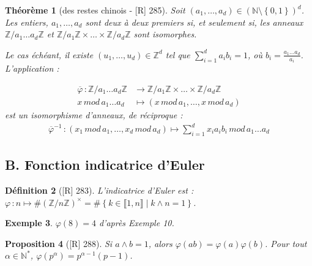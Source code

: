 \documentclass[10pt, a4paper, parskip=full, twoside, twocolumn]{report}
\newtheorem{definition}{Définition}
\newtheorem{theorem}[definition]{Théorème}
\newtheorem{proposition}[definition]{Proposition}
\newtheorem{example}[definition]{Exemple}
\newcommand{\IN}{\mathbb{N}}
\newcommand{\IZ}{\mathbb{Z}}
\newcommand{\IZnZ}{\mathbb{Z}/n\mathbb{Z}}
\begin{document}
\begin{tcolorbox}[
    breakable, %
    colback=developpement, %
    colframe=gray!0!black, %
    boxrule=0pt, %
    arc=1mm, %
	boxsep=0pt,
	left=0pt, right=0pt, top=0pt, bottom=0pt
]
\begin{theorem}[des restes chinois - \textnormal{[R] 285}]
	\label{120dev1}
	Soit $(a_1,\dots, a_d)\in \left(\IN\setminus \left\{0,1\right\}\right)^d$.
	Les entiers, $a_1,\dots, a_d$ sont deux à deux premiers si, et seulement si, les anneaux 
	$\IZ/a_1\dots a_d\IZ$ et $\IZ/a_1\IZ \times \dots \times \IZ/a_d\IZ$ sont isomorphes.

	Le cas échéant, il existe $(u_1,\dots,u_d)\in\IZ^d$ tel que $\sum_{i=1}^{d} a_ib_i =1$, où 
	$b_i = \frac{a_1\dots a_d}{a_i}$. L'application :

	\begin{align*}
		\overline{\varphi} \,\colon \IZ/a_1\dots a_d\IZ &\to \IZ/a_1\IZ \times \dots \times \IZ/a_d\IZ \\
		x\,mod\,a_1\dots a_d &\mapsto (x\,mod\,a_1,\dots, x\, mod\, a_d)
	\end{align*}
	est un isomorphisme d'anneaux, de réciproque :
	\begin{align*}
		\overline{\varphi}^{-1}\,\colon (x_1\,mod\,a_1,\dots, x_d\, mod\, a_d) \mapsto \sum_{i=1}^{d} x_i a_i b_i\, mod\, a_1\dots a_d
	\end{align*}
\end{theorem}
\end{tcolorbox}

\subsection*{B. Fonction indicatrice d'Euler}
\begin{definition}[\textnormal{[R] 283}]
	\emph{L'indicatrice d'Euler} est :
	$\varphi\,\colon n \mapsto \#\left(\IZnZ\right)^{\times} = \#\left\{k\in\llbracket 1,n\rrbracket \mid k\wedge n = 1\right\}$.
\end{definition}

\begin{example}
	$\varphi(8) = 4$ d'après Exemple 10.
\end{example}

\begin{proposition}[\textnormal{[R] 288}]
	Si $a\wedge b=1$, alors $\varphi(ab)=\varphi(a)\varphi(b)$.
	Pour tout $\alpha \in \IN^*$, $\varphi(p^{\alpha}) = p^{\alpha - 1}(p-1)$.
\end{proposition}
\end{document}
